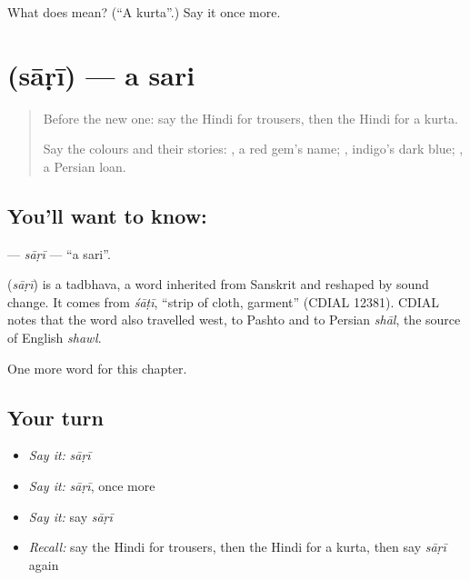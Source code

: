 \begin{tcolorbox}[breakable,colback=teal!4,colframe=teal!35!black,title={Before you move on}]
What does  mean? (\textquotedblleft{}A kurta\textquotedblright{}.) Say it once more.
\end{tcolorbox}
\section[\texorpdfstring{\hi{साड़ी} (sāṛī)}{साड़ी (sāṛī)}]{ (sāṛī) — a sari}

\label{lesson:HI-C136-sari}



\begin{quote}
Before the new one: say the Hindi for trousers, then the Hindi for a kurta.

Say the colours and their stories: \textbf{}, a red gem's name; \textbf{}, indigo's dark blue; \textbf{}, a Persian loan.
\end{quote}

\subsection*{You'll want to know: }
\textbf{} — \emph{sāṛī} — \textquotedblleft{}a sari\textquotedblright{}.

\begin{cousinweb}
\textbf{} (\emph{sāṛī}) is a tadbhava, a word inherited from Sanskrit and reshaped by sound change. It comes from \emph{śāṭī}, \textquotedblleft{}strip of cloth, garment\textquotedblright{} (CDIAL 12381). CDIAL notes that the word also travelled west, to Pashto and to Persian \emph{shāl}, the source of English \emph{shawl}.
\end{cousinweb}

\begin{grammarlens}[title={What you've built}]
One more word for this chapter.
\end{grammarlens}

\subsection*{Your turn}
\begin{itemize}
\raggedright
  \item \emph{Say it:} \emph{sāṛī}
  \item \emph{Say it:} \emph{sāṛī}, once more
  \item \emph{Say it:} say \emph{sāṛī}
  \item \emph{Recall:} say the Hindi for trousers, then the Hindi for a kurta, then say \emph{sāṛī} again
\end{itemize}

